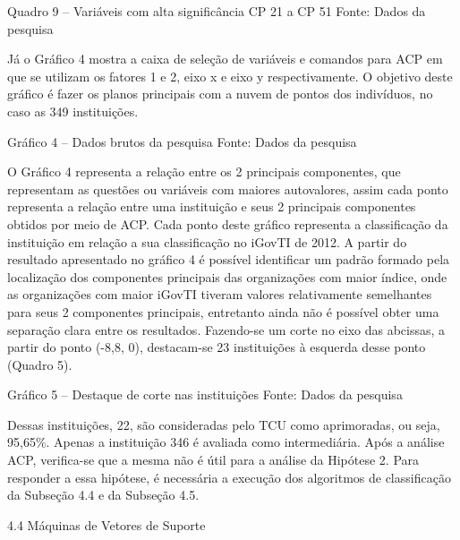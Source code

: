 Quadro 9 – Variáveis com alta significância CP 21 a CP 51
Fonte: Dados da pesquisa

Já o Gráfico 4 mostra a caixa de seleção de variáveis e comandos para ACP em que se utilizam os fatores 1 e 2, eixo x e eixo y respectivamente. O objetivo deste gráfico é fazer os planos principais com a nuvem de pontos dos indivíduos, no caso as 349 instituições.  


Gráfico 4 – Dados brutos da pesquisa
Fonte: Dados da pesquisa

O Gráfico 4 representa a relação entre os 2 principais componentes, que representam as questões ou variáveis com maiores autovalores, assim cada ponto representa a relação entre uma instituição e seus 2 principais componentes obtidos por meio de ACP. Cada ponto deste gráfico representa a classificação da instituição em relação a sua classificação no iGovTI de 2012. A partir do resultado apresentado no gráfico 4 é possível identificar um padrão formado pela localização dos componentes principais das organizações com maior índice, onde as organizações com maior iGovTI tiveram valores relativamente semelhantes para seus 2 componentes principais, entretanto ainda não é possível obter uma separação clara entre os resultados. Fazendo-se um corte no eixo das abcissas, a partir do ponto (-8,8, 0), destacam-se 23 instituições à esquerda desse ponto (Quadro 5). 

Gráfico 5 – Destaque de corte nas instituições 
Fonte: Dados da pesquisa

Dessas instituições, 22, são consideradas pelo TCU como aprimoradas, ou seja, 95,65\%. Apenas a instituição 346 é avaliada como intermediária.
Após a análise ACP, verifica-se que a mesma não é útil para a análise da Hipótese 2. Para responder a essa hipótese, é necessária a execução dos algoritmos de classificação da Subseção 4.4 e da Subseção 4.5.

4.4 Máquinas de Vetores de Suporte


